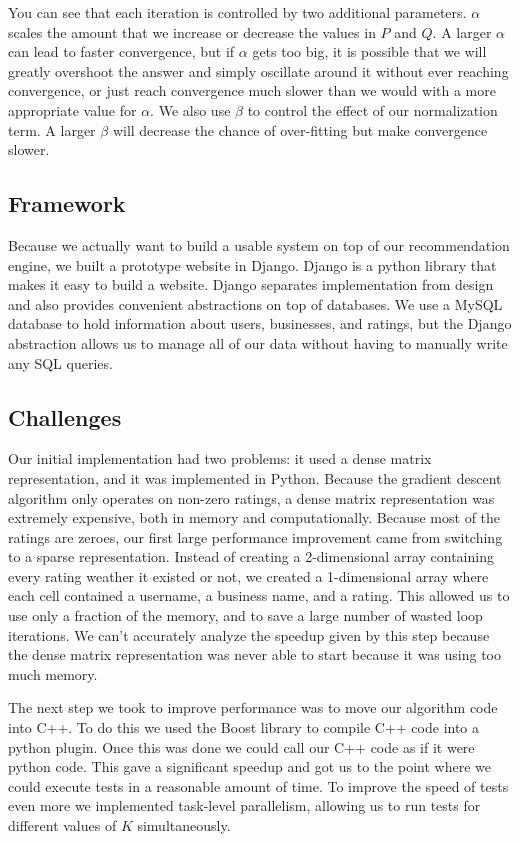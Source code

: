 You can see that each iteration is controlled by two additional parameters.
$\alpha$ scales the amount that we increase or decrease the values in $P$ and $Q$. A larger $\alpha$
can lead to faster convergence, but if $\alpha$ gets too big, it is possible that
we will greatly overshoot the answer and simply oscillate around it without ever
reaching convergence, or just reach convergence much slower than we would with a
more appropriate value for $\alpha$. We also use $\beta$ to control the effect
of our normalization term. A larger $\beta$ will decrease the chance of
over-fitting but make convergence slower.

\subsection{Framework}

Because we actually want to build a usable system on top of our recommendation
engine, we built a prototype website in Django. Django is a python library that
makes it easy to build a website. Django separates implementation from design
and also provides convenient abstractions on top of databases. We use a MySQL
database to hold information about users, businesses, and ratings, but the
Django abstraction allows us to manage all of our data without having to
manually write any SQL queries.

\subsection{Challenges}

Our initial implementation had two problems: it used a dense matrix
representation, and it was implemented in Python. Because the gradient descent
algorithm only operates on non-zero ratings, a dense matrix representation was
extremely expensive, both in memory and computationally. Because most of the
ratings are zeroes, our first large performance improvement came from switching
to a sparse representation. Instead of creating a 2-dimensional array containing
every rating weather it existed or not, we created a 1-dimensional array where
each cell contained a username, a business name, and a rating. This allowed us
to use only a fraction of the memory, and to save a large number of wasted loop
iterations. We can't accurately analyze the speedup given by this step because
the dense matrix representation was never able to start because it was using too
much memory. 

The next step we took to improve performance was to move our algorithm code into
C++. To do this we used the Boost library to compile C++ code into a python
plugin. Once this was done we could call our C++ code as if it were python code.
This gave a significant speedup and got us to the point where we could execute
tests in a reasonable amount of time. To improve the speed of tests even more we
implemented task-level parallelism, allowing us to run tests for different
values of $K$ simultaneously.

